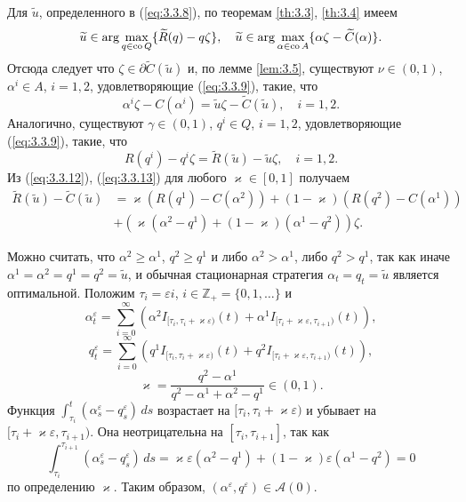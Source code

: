 Для $\widetilde u$, определенного в (\ref{eq:3.3.8}), по теоремам \ref{th:3.3}, \ref{th:3.4} имеем
$$ \widetilde u\in\arg\max_{q\in {\rm co\,} Q} \{\widetilde R(q)-q\zeta\},\quad
   \widetilde u\in\arg\max_{\alpha\in{\rm co\,} A}\{\alpha\zeta-\widetilde C(\alpha)\}.$$
Отсюда следует что $\zeta\in\partial\widetilde C(\widetilde u)$ и, по лемме \ref{lem:3.5}, существуют $\nu\in (0,1)$, $\alpha^i\in A$, $i=1,2$, удовлетворяющие (\ref{eq:3.3.9}), такие, что
\begin{equation} \label{eq:3.3.12}
 \alpha^i\zeta-C(\alpha^i)=\widetilde u\zeta-\widetilde C(\widetilde u),\quad i=1,2.
\end{equation}
Аналогично, существуют $\gamma\in (0,1)$, $q^i\in Q$, $i=1,2$, удовлетворяющие (\ref{eq:3.3.9}), такие, что
\begin{equation} \label{eq:3.3.13}
 R(q^i)-q^i\zeta=\widetilde R(\widetilde u)-\widetilde u\zeta,\quad i=1,2.
\end{equation}
Из (\ref{eq:3.3.12}), (\ref{eq:3.3.13}) для любого $\varkappa\in [0,1]$ получаем
\begin{align} \label{eq:3.3.14}
\widetilde R(\widetilde u)-\widetilde C(\widetilde u) &= \varkappa (R(q^1)-C(\alpha^2))+(1-\varkappa)(R(q^2)-C(\alpha^1))\nonumber\\
 &+(\varkappa(\alpha^2-q^1)+(1-\varkappa)(\alpha^1-q^2))\zeta.
\end{align}

Можно считать, что $\alpha^2\ge\alpha^1$, $q^2\ge q^1$ и либо $\alpha^2>\alpha^1$, либо $q^2>q^1$, так как иначе $\alpha^1=\alpha^2=q^1=q^2=\widetilde u$, и обычная стационарная стратегия $\alpha_t=q_t=\widetilde u$ является оптимальной. Положим $\tau_i=\varepsilon i$, $i\in\mathbb Z_+=\{0,1,\dots\}$ и
\begin{equation} \label{eq:3.3.15}
\alpha_t^\varepsilon=\sum_{i=0}^\infty\left( \alpha^2 I_{[\tau_i,\tau_i+\varkappa\varepsilon)}(t)+\alpha^1 I_{[\tau_i+\varkappa\varepsilon,\tau_{i+1})}(t)\right),
\end{equation}
\begin{equation} \label{eq:3.3.16}
q^\varepsilon_t=\sum_{i=0}^\infty \left( q^1 I_{[\tau_i,\tau_i+\varkappa\varepsilon)}(t)+q^2 I_{[\tau_i+\varkappa\varepsilon,\tau_{i+1})}(t)\right),
\end{equation}
$$ \varkappa=\frac{q^2-\alpha^1}{q^2-\alpha^1+\alpha^2-q^1}\in (0,1).$$
Функция $\int_{\tau_i}^t(\alpha_s^\varepsilon - q^\varepsilon_s)\,ds$ возрастает на $[\tau_i,\tau_i+\varkappa\varepsilon)$ и убывает на $[\tau_i+\varkappa\varepsilon,\tau_{i+1})$. Она неотрицательна на $[\tau_i,\tau_{i+1}]$, так как
$$\int_{\tau_i}^{\tau_{i+1}}(\alpha_s^\varepsilon - q^\varepsilon_s)\,ds=\varkappa\varepsilon(\alpha^2-q^1)+(1-\varkappa)\varepsilon(\alpha^1-q^2)=0$$
по определению $\varkappa$. Таким образом, $(\alpha^\varepsilon,q^\varepsilon)\in\mathscr A(0)$.


